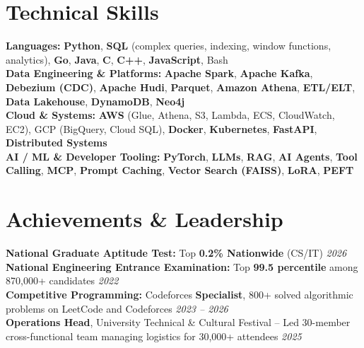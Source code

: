 \documentclass[10pt]{article}
\begin{document}
\section*{Technical Skills}
\textbf{Languages:} \textbf{Python}, \textbf{SQL} (complex queries, indexing, window functions, analytics), \textbf{Go}, \textbf{Java}, \textbf{C}, \textbf{C++}, \textbf{JavaScript}, Bash \\
\textbf{Data Engineering \& Platforms:} \textbf{Apache Spark}, \textbf{Apache Kafka}, \textbf{Debezium (CDC)}, \textbf{Apache Hudi}, \textbf{Parquet}, \textbf{Amazon Athena}, \textbf{ETL/ELT}, \textbf{Data Lakehouse}, \textbf{DynamoDB}, \textbf{Neo4j} \\
\textbf{Cloud \& Systems:} \textbf{AWS} (Glue, Athena, S3, Lambda, ECS, CloudWatch, EC2), GCP (BigQuery, Cloud SQL), \textbf{Docker}, \textbf{Kubernetes}, \textbf{FastAPI}, \textbf{Distributed Systems} \\
\textbf{AI / ML \& Developer Tooling:} \textbf{PyTorch}, \textbf{LLMs}, \textbf{RAG}, \textbf{AI Agents}, \textbf{Tool Calling}, \textbf{MCP}, \textbf{Prompt Caching}, \textbf{Vector Search (FAISS)}, \textbf{LoRA}, \textbf{PEFT}
\vspace{-0.35em}

\section*{Achievements \& Leadership}
\textbf{National Graduate Aptitude Test:} Top \textbf{0.2\% Nationwide} (CS/IT) \hfill \textit{2026} \\[0.1em]
\textbf{National Engineering Entrance Examination:} Top \textbf{99.5 percentile} among 870,000+ candidates \hfill \textit{2022} \\[0.1em]
\textbf{Competitive Programming:} Codeforces \textbf{Specialist}, 800+ solved algorithmic problems on LeetCode and Codeforces \hfill \textit{2023 -- 2026} \\[0.1em]
\textbf{Operations Head}, University Technical & Cultural Festival -- Led 30-member cross-functional team managing logistics for 30,000+ attendees \hfill \textit{2025}
\end{document}
